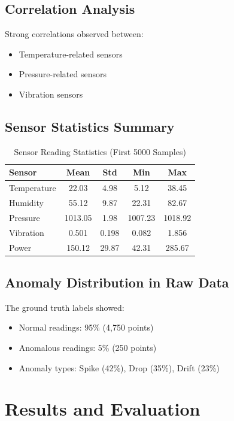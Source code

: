 \documentclass[12pt,a4paper]{report}
\begin{document}
\section{Correlation Analysis}
Strong correlations observed between:
\begin{itemize}
    \item Temperature-related sensors
    \item Pressure-related sensors
    \item Vibration sensors
\end{itemize}

\section{Sensor Statistics Summary}

\begin{table}[H]
\centering
\caption{Sensor Reading Statistics (First 5000 Samples)}
\begin{tabular}{lcccc}
\toprule
\textbf{Sensor} & \textbf{Mean} & \textbf{Std} & \textbf{Min} & \textbf{Max} \\
\midrule
Temperature & 22.03 & 4.98 & 5.12 & 38.45 \\
Humidity & 55.12 & 9.87 & 22.31 & 82.67 \\
Pressure & 1013.05 & 1.98 & 1007.23 & 1018.92 \\
Vibration & 0.501 & 0.198 & 0.082 & 1.856 \\
Power & 150.12 & 29.87 & 42.31 & 285.67 \\
\bottomrule
\end{tabular}
\end{table}

\section{Anomaly Distribution in Raw Data}

The ground truth labels showed:
\begin{itemize}
    \item Normal readings: 95\% (4,750 points)
    \item Anomalous readings: 5\% (250 points)
    \item Anomaly types: Spike (42\%), Drop (35\%), Drift (23\%)
\end{itemize}

\chapter{Results and Evaluation}
\end{document}
